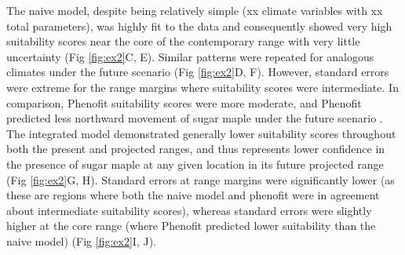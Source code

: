 The naive model, despite being relatively simple (xx climate variables with xx total parameters), was highly fit to the data and consequently showed very high suitability scores near the core of the contemporary range with very little uncertainty (Fig \ref{fig:ex2}C, E).
Similar patterns were repeated for analogous climates under the future scenario (Fig \ref{fig:ex2}D, F).
However, standard errors were extreme for the range margins where suitability scores were intermediate.
In comparison, Phenofit suitability scores were more moderate, and Phenofit predicted less northward movement of sugar maple under the future scenario \citep[Fig. \ref{fig:ex2}A, B;][]{Morin2009}.
The integrated model demonstrated generally lower suitability scores throughout both the present and projected ranges, and thus represents lower confidence in the presence of sugar maple at any given location in its future projected range (Fig \ref{fig:ex2}G, H).
Standard errors at range margins were significantly lower (as these are regions where both the naive model and phenofit were in agreement about intermediate suitability scores), whereas standard errors were slightly higher at the core range (where Phenofit predicted lower suitability than the naive model) (Fig \ref{fig:ex2}I, J).


